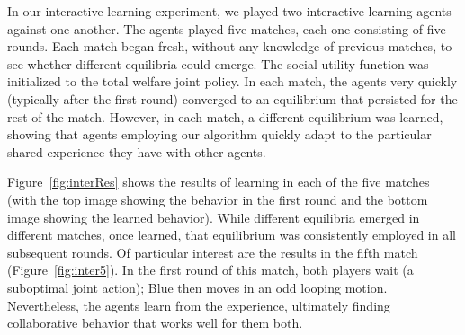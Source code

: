 In our interactive learning experiment,
we played two interactive learning agents against one another.  The
agents played five matches, each one consisting of five rounds.  Each
match began fresh, without any knowledge of previous matches, to see
whether different equilibria could emerge.  The social utility
function was initialized to the total welfare joint policy.  In each
match, the agents very quickly (typically after the first round)
converged to an equilibrium that persisted for the rest of the match.
However, in each match, a different equilibrium was learned, showing
that agents employing our algorithm quickly adapt to the particular
shared experience they have with other agents.

Figure~\ref{fig:interRes} shows the results of learning in each of the
five matches (with the top image showing the behavior in the first
round and the bottom image showing the learned behavior). While
different equilibria emerged in different matches, once learned, that
equilibrium was consistently employed in all subsequent rounds.  Of
particular interest are the results in the fifth match
(Figure~\ref{fig:inter5}). In the first round of this match, both
players wait (a suboptimal joint action); Blue then moves in an
odd looping motion. Nevertheless, the agents learn from the experience,
ultimately finding collaborative behavior that works well for them both.


